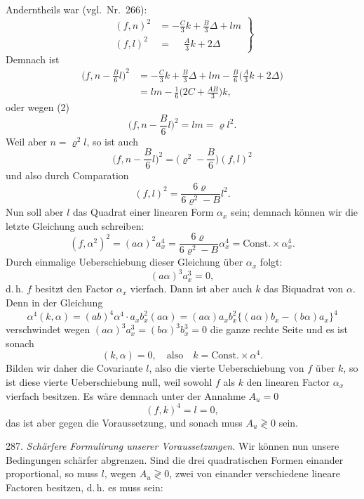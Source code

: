 \documentclass[11pt]{article}
\providecommand{\weberpage}[1]{}
\providecommand{\weq}[2]{\begin{equation}\tag{#1}#2\end{equation}}
\begin{document}
Anderntheils war (vgl.\ Nr.\ 266):
\weq{3}{
\left.\begin{aligned}
(f,n)^2&=-\frac{C}{3}k+\frac{B}{3}\varDelta+lm\\
(f,l)^2&=\phantom{-}\frac{A}{3}k+2\varDelta
\end{aligned}\right\}
}
Demnach ist
\[
\begin{aligned}
\Big(f,n-\frac{B}{6}l\Big)^2&=-\frac{C}{3}k+\frac{B}{3}\varDelta+lm-\frac{B}{6}\Big(\frac{A}{3}k+2\varDelta\Big)\\
&=lm-\frac{1}{6}\Big(2C+\frac{AB}{3}\Big)k,
\end{aligned}
\]
oder wegen (2)
\weq{4}{\Big(f,n-\frac{B}{6}l\Big)^2=lm=\varrho l^2.}
Weil aber $n=\varrho^2l$, so ist auch
\weq{5}{\Big(f,n-\frac{B}{6}l\Big)^2=\Big(\varrho^2-\frac{B}{6}\Big)(f,l)^2}
und also durch Comparation
\[
(f,l)^2=\frac{6\varrho}{6\varrho^2-B}l^2.
\]
Nun soll aber $l$ das Quadrat einer linearen Form $\alpha_x$ sein; demnach können wir die letzte Gleichung auch schreiben:
\[
(f,\alpha^2)^2=(a\alpha)^2a_x^4=\frac{6\varrho}{6\varrho^2-B}\alpha_x^4=\text{Const.}\times\alpha_x^4.
\]
Durch einmalige Ueberschiebung dieser Gleichung über $\alpha_x$ folgt:
\[
(a\alpha)^3a_x^3=0,
\]
d.\,h. $f$ besitzt den Factor $\alpha_x$ vierfach.
Dann ist aber auch $k$ das Biquadrat von $\alpha$. Denn in der Gleichung
\[
\alpha^4(k,\alpha)=(ab)^4\alpha^4\cdot a_xb_x^2(a\alpha)=(a\alpha)a_xb_x^2\{(a\alpha)b_x-(b\alpha)a_x\}^4
\]
verschwindet wegen $(a\alpha)^3a_x^3=(b\alpha)^3b_x^3=0$ die ganze rechte Seite und es ist sonach
\[
(k,\alpha)=0,\quad\text{also}\quad k=\text{Const.}\times\alpha^4.
\]
Bilden wir daher die Covariante $l$, also die vierte Ueberschiebung von $f$ über $k$, so ist diese vierte Ueberschiebung null, weil sowohl $f$ als $k$ den linearen Factor $\alpha_x$ vierfach besitzen. Es wäre demnach unter der Annahme $A_u=0$
\[
(f,k)^4=l=0,
\]
das ist aber gegen die Voraussetzung, und sonach muss $A_u\gtrless 0$ sein.

287. \textit{Schärfere Formulirung unserer Voraussetzungen.} Wir können nun unsere Bedingungen schärfer abgrenzen. Sind die drei quadratischen Formen einander proportional, so muss $l$, wegen $A_u\gtrless 0$, zwei von einander verschiedene lineare Factoren besitzen, d.\,h. es muss sein:


\weberpage{312}
\end{document}
